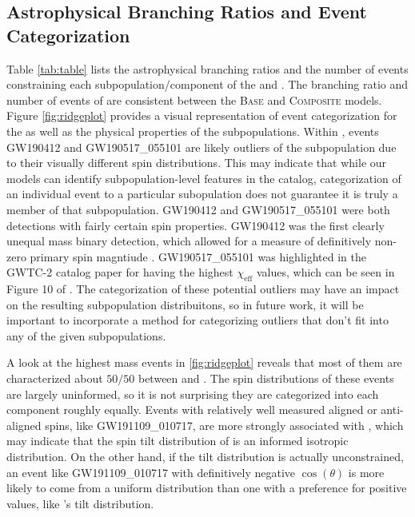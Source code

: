 \subsection{Astrophysical Branching Ratios and Event Categorization}

Table \ref{tab:table} lists the astrophysical branching ratios and the number of events constraining each subpopulation/component of the \base{} and \comp{}. The branching ratio and number of events of \first{} are consistent between the \textsc{Base} and \textsc{Composite} models. Figure \ref{fig:ridgeplot} provides a visual representation of event categorization for the \comp{} as well as the physical properties of the subpopulations. Within \contA{}, events GW190412 and GW190517\_055101 are likely outliers of the subpopulation due to their visually different spin distributions. This may indicate that while our models can identify subpopulation-level features in the catalog, categorization of an individual event to a particular subopulation does not guarantee it is truly a member of that subpopulation. GW190412 and GW190517\_055101 were both detections with fairly certain spin properties. GW190412 was the first clearly unequal mass binary detection, which allowed for a measure of definitively non-zero primary spin magntiude \citep{10.3847/2041-8213/aba8ef, 2010.14527}. GW190517\_055101 was highlighted in the GWTC-2 catalog paper \citet{2010.14527} for having the highest $\chi_\text{eff}$ values, which can be seen in Figure 10 of \citet{2010.14527}. The categorization of these potential outliers may have an impact on the resulting subpopulation distribuitons, so in future work, it will be important to incorporate a method for categorizing outliers that don't fit into any of the given subpopulations. 

A look at the highest mass events in \ref{fig:ridgeplot} reveals that most of them are characterized about $50/50$ between \contA{} and \contB{}. The spin distributions of these events are largely uninformed, so it is not surprising they are categorized into each component roughly equally. Events with relatively well measured aligned or anti-aligned spins, like GW191109\_010717, are more strongly associated with \contB{}, which may indicate that the spin tilt distribution of \contB{} is an informed isotropic distribution. On the other hand, if the tilt distribution is actually unconstrained, an event like GW191109\_010717 with definitively negative $\cos(\theta)$ is more likely to come from a uniform distribution than one with a preference for positive values, like \contA{}'s tilt distribution. 

